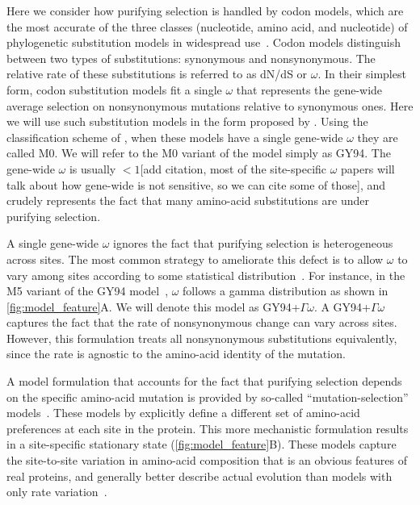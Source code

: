 \documentclass[11pt]{article}
\newcommand\jdbcomment[1]{{\color{red}[#1]}}
\begin{document}
Here we consider how purifying selection is handled by codon models, which are the most accurate of the three classes (nucleotide, amino acid, and nucleotide) of phylogenetic substitution models in widespread use~\citep{arenas2015trends}.
Codon models distinguish between two types of substitutions: synonymous and nonsynonymous.
The relative rate of these substitutions is referred to as dN/dS or $\omega$.
In their simplest form, codon substitution models fit a single $\omega$ that represents the gene-wide average selection on nonsynonymous mutations relative to synonymous ones.
Here we will use such substitution models in the form proposed by \citet{goldman1994codon}.
Using the classification scheme of \citet{yang2000codon}, when these models have a single gene-wide $\omega$ they are called M0.
We will refer to the M0 variant of the \citet{goldman1994codon} model simply as GY94.
The gene-wide $\omega$ is usually $<1$\jdbcomment{add citation, most of the site-specific $\omega$ papers will talk about how gene-wide is not sensitive, so we can cite some of those}, and crudely represents the fact that many amino-acid substitutions are under purifying selection.

A single gene-wide $\omega$ ignores the fact that purifying selection is heterogeneous across sites.
The most common strategy to ameliorate this defect is to allow $\omega$ to vary among sites according to some statistical distribution~\citep{yang1994maximum,yang2000codon}.
For instance, in the M5 variant of the GY94 model~\citep{yang2000codon}, $\omega$ follows a gamma distribution as shown in \ref{fig:model_feature}A.
We will denote this model as GY94+$\Gamma\omega$.
A GY94+$\Gamma\omega$ captures the fact that the rate of nonsynonymous change can vary across sites. 
However, this formulation treats all nonsynonymous substitutions equivalently, since the rate is agnostic to the amino-acid identity of the mutation. 

A model formulation that accounts for the fact that purifying selection depends on the specific amino-acid mutation is provided by so-called ``mutation-selection'' models~\citep{halpern1998evolutionary,yang2008mutation,rodrigue2010mutation,tamuri2012estimating,mccandlish2014modeling}.
These models by explicitly define a different set of amino-acid preferences at each site in the protein. 
This more mechanistic formulation results in a site-specific stationary state (\ref{fig:model_feature}B). 
These models capture the site-to-site variation in amino-acid composition that is an obvious features of real proteins, and generally better describe actual evolution than models with only rate variation~\citep{lartillot2004bayesian, le2008phylogenetic, rodrigue2010mutation,hilton2017phydms,bloom2014experimentally}.
\end{document}
